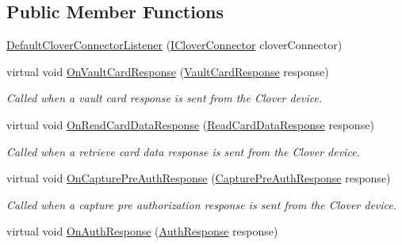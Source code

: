 \subsection*{Public Member Functions}
\begin{DoxyCompactItemize}
\item 
\hyperlink{classcom_1_1clover_1_1remotepay_1_1sdk_1_1_default_clover_connector_listener_a3b49feb5fdc75207df4254e78ae32844}{Default\+Clover\+Connector\+Listener} (\hyperlink{interfacecom_1_1clover_1_1remotepay_1_1sdk_1_1_i_clover_connector}{I\+Clover\+Connector} clover\+Connector)
\item 
virtual void \hyperlink{classcom_1_1clover_1_1remotepay_1_1sdk_1_1_default_clover_connector_listener_a99a7cfe7cd6778bc4ec94a06e6f28420}{On\+Vault\+Card\+Response} (\hyperlink{classcom_1_1clover_1_1remotepay_1_1sdk_1_1_vault_card_response}{Vault\+Card\+Response} response)
\begin{DoxyCompactList}\small\item\em Called when a vault card response is sent from the Clover device. \end{DoxyCompactList}\item 
virtual void \hyperlink{classcom_1_1clover_1_1remotepay_1_1sdk_1_1_default_clover_connector_listener_abf40aa043a50f59be9e36c3911ac895d}{On\+Read\+Card\+Data\+Response} (\hyperlink{classcom_1_1clover_1_1remotepay_1_1sdk_1_1_read_card_data_response}{Read\+Card\+Data\+Response} response)
\begin{DoxyCompactList}\small\item\em Called when a retrieve card data response is sent from the Clover device. \end{DoxyCompactList}\item 
virtual void \hyperlink{classcom_1_1clover_1_1remotepay_1_1sdk_1_1_default_clover_connector_listener_a8b16a6574748f4ae7852d710c169a86e}{On\+Capture\+Pre\+Auth\+Response} (\hyperlink{classcom_1_1clover_1_1remotepay_1_1sdk_1_1_capture_pre_auth_response}{Capture\+Pre\+Auth\+Response} response)
\begin{DoxyCompactList}\small\item\em Called when a capture pre authorization response is sent from the Clover device. \end{DoxyCompactList}\item 
virtual void \hyperlink{classcom_1_1clover_1_1remotepay_1_1sdk_1_1_default_clover_connector_listener_afbe9b03563cc7129384a094eae1adbe5}{On\+Auth\+Response} (\hyperlink{classcom_1_1clover_1_1remotepay_1_1sdk_1_1_auth_response}{Auth\+Response} response)

\end{DoxyCompactItemize}
